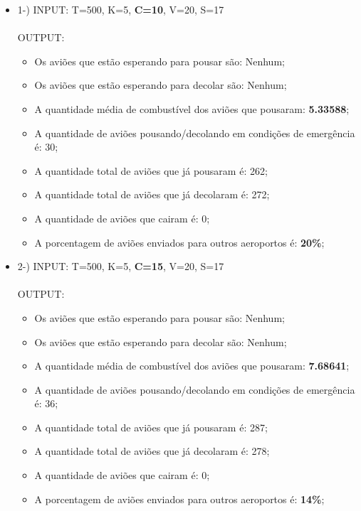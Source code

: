 \documentclass{article}
\begin{document}
\hline

\begin{itemize}
   \item 1-) INPUT: T=500, K=5, \textbf{C=10}, V=20, S=17\\\\
   OUTPUT: 
   \begin{itemize}
      \item Os aviões que estão esperando para pousar são: Nenhum;
      \item Os aviões que estão esperando para decolar são: Nenhum;
      \item A quantidade média de combustível dos aviões que pousaram: \textbf{5.33588};
      \item A quantidade de aviões pousando/decolando em condições de emergência é: 30;
      \item A quantidade total de aviões que já pousaram é: 262;
      \item A quantidade total de aviões que já decolaram é: 272;
      \item A quantidade de aviões que cairam é: 0;
      \item A porcentagem de aviões enviados para outros aeroportos é: \textbf{20\%};
   \end{itemize} 
\end{itemize}
  
\hline

\begin{itemize}
   \item 2-) INPUT: T=500, K=5, \textbf{C=15}, V=20, S=17\\\\
   OUTPUT: 
   \begin{itemize}
      \item Os aviões que estão esperando para pousar são: Nenhum;
      \item Os aviões que estão esperando para decolar são: Nenhum;
      \item A quantidade média de combustível dos aviões que pousaram: \textbf{7.68641};
      \item A quantidade de aviões pousando/decolando em condições de emergência é: 36;
      \item A quantidade total de aviões que já pousaram é: 287;
      \item A quantidade total de aviões que já decolaram é: 278;
      \item A quantidade de aviões que cairam é: 0;
      \item A porcentagem de aviões enviados para outros aeroportos é: \textbf{14\%};
   \end{itemize}
\end{itemize}
\end{document}

